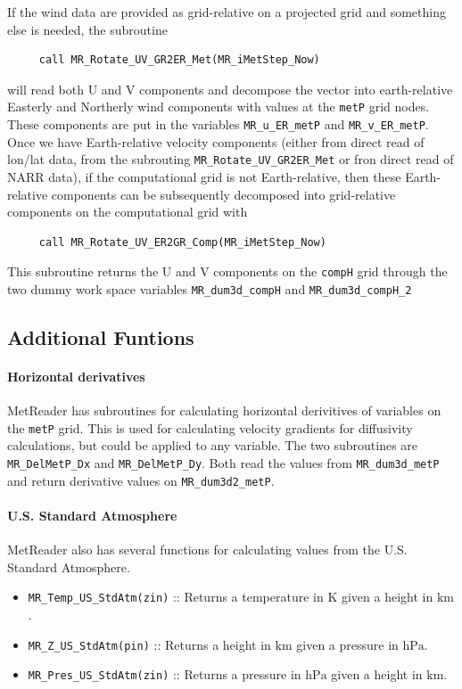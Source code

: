 \documentclass[11pt]{article}   %
\begin{document}
If the wind data are provided as grid-relative on a projected grid and something else
is needed, the subroutine
\begin{verbatim}
     call MR_Rotate_UV_GR2ER_Met(MR_iMetStep_Now)
\end{verbatim}
will read both U and V components and decompose the vector into earth-relative Easterly
and Northerly wind components with values at the \texttt{metP} grid nodes.  These
components are put in the variables \texttt{MR\_u\_ER\_metP} and \texttt{MR\_v\_ER\_metP}.
Once we have Earth-relative velocity components (either from direct read of lon/lat data,
from the subrouting \texttt{MR\_Rotate\_UV\_GR2ER\_Met} or fron direct read of NARR data),
if the computational grid is not Earth-relative, then these Earth-relative components can be
subsequently decomposed into grid-relative components on the computational grid with
\begin{verbatim}
     call MR_Rotate_UV_ER2GR_Comp(MR_iMetStep_Now)
\end{verbatim}
This subroutine returns the U and V components on the \texttt{compH} grid through the two
dummy work space variables \texttt{MR\_dum3d\_compH} and \texttt{MR\_dum3d\_compH\_2}

\subsection{Additional Funtions}
\paragraph{Horizontal derivatives}
MetReader has subroutines for calculating horizontal derivitives of variables on the
\texttt{metP} grid.  This is used for calculating velocity gradients for diffusivity
calculations, but could be applied to any variable.  The two subroutines are
\texttt{MR\_DelMetP\_Dx} and \texttt{MR\_DelMetP\_Dy}.  Both read the values from
\texttt{MR\_dum3d\_metP} and return derivative values on \texttt{MR\_dum3d2\_metP}.

\paragraph{U.S. Standard Atmosphere}
MetReader also has several functions for calculating values from the U.S. Standard
Atmosphere.
\begin{itemize}
\item  \texttt{MR\_Temp\_US\_StdAtm(zin)} :: Returns a temperature in $\mathrm{K}$
given a height in $\mathrm{km}$.
\item  \texttt{MR\_Z\_US\_StdAtm(pin)} :: Returns a height in $\mathrm{km}$ given a
pressure in $\mathrm{hPa}$.
\item  \texttt{MR\_Pres\_US\_StdAtm(zin)} :: Returns a pressure in $\mathrm{hPa}$ given
a height in $\mathrm{km}$.
\end{itemize}
\end{document}
